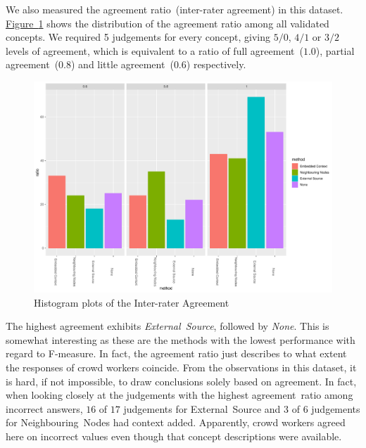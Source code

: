 We also measured the agreement ratio~(inter-rater agreement) in this dataset. \hyperref[fig:hist_agreement_climate_change_all]{Figure~\ref*{fig:hist_agreement_climate_change_all}} shows the distribution of the agreement ratio among all validated concepts. We required 5 judgements for every concept, giving $5/0$, $4/1$ or $3/2$ levels of agreement, which is equivalent to a ratio of full agreement~($1.0$), partial agreement~($0.8$) and little agreement~($0.6$) respectively. 
\begin{figure}
  	 \includegraphics[width=\textwidth]{plots/climate_change/hist_agreement}
  	 \caption{Histogram plots of the Inter-rater Agreement}\label{fig:hist_agreement_climate_change_all}
\end{figure}

The highest agreement exhibits \emph{External~Source}, followed by \emph{None}. This is somewhat interesting as these are the methods with the lowest performance with regard to F-measure. In fact, the agreement ratio just describes to what extent the responses of crowd workers coincide. From the observations in this dataset, it is hard, if not impossible, to draw conclusions solely based on agreement. In fact, when looking closely at the judgements with the highest agreement~ratio among incorrect answers, $16$ of $17$ judgements for External~Source and $3$ of $6$ judgements for Neighbouring~Nodes had context added. Apparently, crowd workers agreed here on incorrect values even though that concept descriptions were available. 


